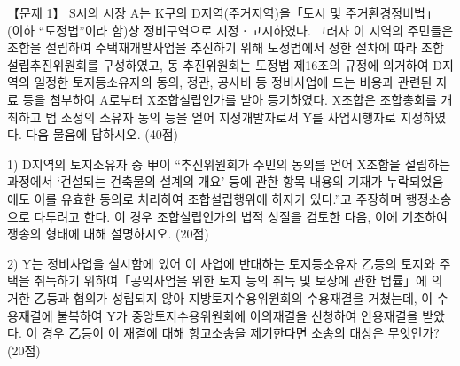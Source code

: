 \begin{longquestion}{【문제 1】}
S시의 시장 A는 K구의 D지역(주거지역)을「도시 및 주거환경정비법」(이하 “도정법”이라 함)상 정비구역으로 지정ㆍ고시하였다. 그러자 이 지역의 주민들은 조합을 설립하여 주택재개발사업을 추진하기 위해 도정법에서 정한 절차에 따라 조합설립추진위원회를 구성하였고, 동 추진위원회는 도정법 제16조의 규정에 의거하여 D지역의 일정한 토지등소유자의 동의, 정관, 공사비 등 정비사업에 드는 비용과 관련된 자료 등을 첨부하여 A로부터 X조합설립인가를 받아 등기하였다. X조합은 조합총회를 개최하고 법 소정의 소유자 동의 등을 얻어 지정개발자로서 Y를 사업시행자로 지정하였다. 다음 물음에 답하시오. (40점) \par
1) D지역의 토지소유자 중 甲이 “추진위원회가 주민의 동의를 얻어 X조합을 설립하는 과정에서 ‘건설되는 건축물의 설계의 개요’ 등에 관한 항목 내용의 기재가 누락되었음에도 이를 유효한 동의로 처리하여 조합설립행위에 하자가 있다.”고 주장하며 행정소송으로 다투려고 한다. 이 경우 조합설립인가의 법적 성질을 검토한 다음, 이에 기초하여 쟁송의 형태에 대해 설명하시오. (20점) \par
2) Y는 정비사업을 실시함에 있어 이 사업에 반대하는 토지등소유자 乙등의 토지와 주택을 취득하기 위하여「공익사업을 위한 토지 등의 취득 및 보상에 관한 법률」에 의거한 乙등과 협의가 성립되지 않아 지방토지수용위원회의 수용재결을 거쳤는데, 이 수용재결에 불복하여 Y가 중앙토지수용위원회에 이의재결을 신청하여 인용재결을 받았다. 이 경우 乙등이 이 재결에 대해 항고소송을 제기한다면 소송의 대상은 무엇인가? (20점) \par
\end{longquestion}
